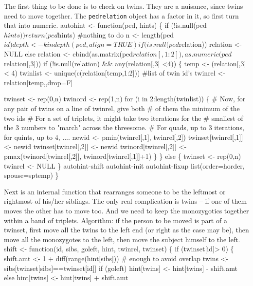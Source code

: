 \documentclass{article}
\begin{document}
The first thing to be done is to check on twins.  They are a nuisance, since
twins need to move together.  The {\tt{}ped{}relation} object has a factor in it, 
so first turn that into numeric.
\nwenddocs{}\endmoddef
autohint <- function(ped, hints) \{
    if (!is.null(ped$hints)) return(ped$hints)  #nothing to do
    n <- length(ped$id)
    depth <- kindepth(ped, align=TRUE)

    if (is.null(ped$relation)) relation <- NULL
    else  relation <- cbind(as.matrix(ped$relation[,1:2]), 
                            as.numeric(ped$relation[,3]))
    if (!is.null(relation) && any(relation[,3] <4)) \{
        temp <- (relation[,3] < 4)
        twinlist <- unique(c(relation[temp,1:2]))  #list of twin id's 
        twinrel  <- relation[temp,,drop=F]
        
        twinset <- rep(0,n)
        twinord <- rep(1,n)
        for (i in 2:length(twinlist)) \{
            # Now, for any pair of twins on a line of twinrel, give both
            #  of them the minimum of the two ids
            # For a set of triplets, it might take two iterations for the
            #  smallest of the 3 numbers to "march" across the threesome.
            #  For quads, up to 3 iterations, for quints, up to 4, ....
            newid <- pmin(twinrel[,1], twinrel[,2])
            twinset[twinrel[,1]] <- newid
            twinset[twinrel[,2]] <- newid
            twinord[twinrel[,2]] <- pmax(twinord[twinrel[,2]], 
                                         twinord[twinrel[,1]]+1)
            \}   
        \}
    else \{
        twinset <- rep(0,n)
        twinrel <- NULL
        \}
    \LA{}autohint-shift\RA{}
    \LA{}autohint-init\RA{}
    \LA{}autohint-fixup\RA{}
    list(order=horder, spouse=sptemp)    
    \}
\nwendcode{}\nwdocspar

Next is an internal function that  rearranges someone to be
the leftmost or rightmost of his/her siblings.  The only
real complication is twins -- if one of them moves the other has to move too.  
And we need to keep the monozygotics together within a band of triplets.
Algorithm: if the person to be moved is part of a twinset, 
first move all the twins to the left end (or right
as the case may be), then move all the monozygotes to the
left, then move the subject himself to the left.
\nwenddocs{}\endmoddef
shift <- function(id, sibs, goleft, hint, twinrel, twinset) \{
    if (twinset[id]> 0)  \{ 
        shift.amt <- 1 + diff(range(hint[sibs]))  # enough to avoid overlap
        twins <- sibs[twinset[sibs]==twinset[id]]
        if (goleft) 
         hint[twins] <- hint[twins] - shift.amt
        else hint[twins] <- hint[twins] + shift.amt
            
\end{document}

